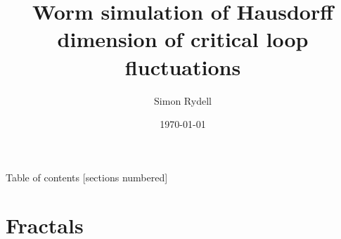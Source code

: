 \documentclass[10pt]{beamer}
\title{Worm simulation of Hausdorff dimension of critical loop fluctuations}
\date{\today}
\date{}
\author{Simon Rydell}
\institute{Royal Institute of Technology, Stockholm}
\begin{document}
\maketitle

\begin{frame}{Table of contents}
  [sections numbered]
  \tableofcontents[hideallsubsections]
\end{frame}

\section{Fractals}


\end{document}
